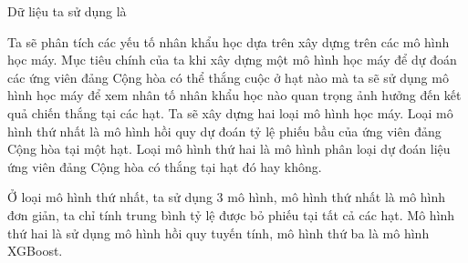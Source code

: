 \documentclass[14pt, a4paper]{article}
\numberwithin{equation}{section}
\numberwithin{figure}{section}
\numberwithin{dl}{section}
\numberwithin{md}{section}
\numberwithin{bd}{section}
\numberwithin{dn}{section}
\numberwithin{hq}{section}
\begin{document}
    Dữ liệu ta sử dụng là 

    Ta sẽ phân tích các yếu tố nhân khẩu học dựa trên xây dựng trên các mô hình học máy.
    Mục tiêu chính của ta khi xây dựng một mô hình học máy để dự đoán các ứng viên đảng Cộng hòa có thể thắng cuộc ở hạt nào mà ta sẽ sử dụng mô hình học máy để xem nhân tố nhân khẩu học nào quan trọng ảnh hưởng đến kết quả chiến thắng tại các hạt.
    Ta sẽ xây dựng hai loại mô hình học máy. 
    Loại mô hình thứ nhất là mô hình hồi quy dự đoán tỷ lệ phiếu bầu của ứng viên đảng Cộng hòa tại một hạt.
    Loại mô hình thứ hai là mô hình phân loại dự đoán liệu ứng viên đảng Cộng hòa có thắng tại hạt đó hay không.

    Ở loại mô hình thứ nhất, ta sử dụng 3 mô hình, mô hình thứ nhất là mô hình đơn giản, ta chỉ tính trung bình tỷ lệ được bỏ phiếu tại tất cả các hạt.
    Mô hình thứ hai là sử dụng mô hình hồi quy tuyến tính, mô hình thứ ba là mô hình XGBoost.





    \newpage
    \printbibliography[title={TÀI LIỆU THAM KHẢO}]
\end{document}
